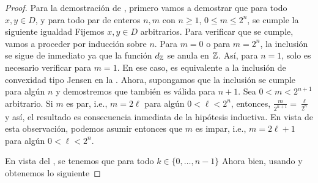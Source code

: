 \begin{proof} 
	Para la demostraci\'on de , primero vamos a demostrar que
	para todo $x,y\in D$, y para todo par de enteros $n,m$ con 
	$n\geq 1$, $0\leq m\leq 2^n$, se cumple la siguiente igualdad
	Fijemos $x,y\in D$ arbitrarios. Para verificar que  se cumple, 
	vamos a proceder por inducci\'on sobre $n$. 
	Para $m=0$ o para $m=2^n$, la inclusi\'on  se sigue de inmediato
	ya que la funci\'on $d_{\mathbb{Z}}$ se anula en $\mathbb{Z}$. As\'i, para $n=1$, solo es necesario
	verificar  para $m=1$. En ese caso,  es equivalente
	a la inclusi\'on de convexidad tipo Jensen en la .
	Ahora, supongamos que la inclusi\'on  se cumple para alg\'un $n$
	y demostremos que tambi\'en es v\'alida para $n+1$. Sea $0<m<2^{n+1}$
	arbitrario. Si $m$ es par, i.e., $m=2\ell$ para alg\'un $0<\ell<2^n$,
	entonces, $\frac{m}{2^{n+1}}=\frac{\ell}{2^n}$ y as\'i, el resultado
	es consecuencia inmediata de la hip\'otesis inductiva. En vista de
	esta observaci\'on, podemos asumir entonces que $m$ es impar, i.e., 
	$m = 2\ell + 1$ para alg\'un $0 < \ell < 2^n$.
	
	En vista del , se tenemos que para todo $k\in\{0,\ldots,n-1\}$ 
	Ahora bien, usando  y  obtenemos lo siguiente
	

\end{proof}
